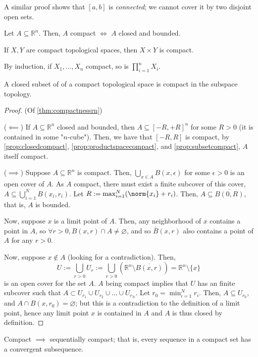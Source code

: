 \begin{remark}
    A similar proof shows that $[a, b]$ is \emph{connected}; we cannot cover it by two disjoint open sets.
\end{remark}

\begin{theorem}[On Compactness]\label{thm:compactnessrn}
    Let $A \subseteq \mathbb{R}^n$. Then, $A$ compact $\iff$ $A$ closed and bounded.
\end{theorem}

\begin{proposition}\label{prop:productspacecompact}
    If $X, Y$ are compact topological spaces, then $X \times Y$ is compact.    
\end{proposition}

\begin{remark}
    By induction, if $X_1, \dots, X_n$ compact, so is $\prod_{i=1}^{n} X_i$.
\end{remark}

\begin{proposition}\label{prop:subsetcompact}
    A closed subset of of a compact topological space is compact in the subspace topology.
\end{proposition}

\begin{proof}(Of \cref{thm:compactnessrn})

    \noindent($\impliedby$) If $A \subseteq \mathbb{R}^n$ closed and bounded, then $A \subseteq [-R, +R]^n$ for some $R > 0$ (it is contained in some "$n$-cube"). Then, we have that $[-R, R]$ is compact, by \cref{prop:closedcompact}, \cref{prop:productspacecompact}, and \cref{prop:subsetcompact}, $A$ itself compact.
    
    \noindent($\implies$) Suppose $A \subseteq \mathbb{R}^n$ is compact. Then, $\bigcup_{x \in A} B(x, \epsilon)$ for some $\epsilon > 0$ is an open cover of $A$. As $A$ compact, there must exist a finite subcover of this cover, $A \subseteq \bigcup_{i = 1}^N B(x_i, r_i)$. Let $R := \max_{i=1}^{N} (\norm{x_i} + r_i)$. Then, $A \subseteq \overline{B(0, R)}$, that is, $A$ is bounded.

    Now, suppose $x$ is a limit point of $A$. Then, any neighborhood of $x$ contains a point in $A$, so $\forall r > 0, B(x, r) \cap A \neq \varnothing$, and so $\overline{B}(x, r)$ also contains a point of $A$ for any $r > 0$. 
    
    Now, suppose $x \notin A$ (looking for a contradiction). Then, \[
    U :=\bigcup_{r > 0} U_r :=  \bigcup_{r > 0} (\mathbb{R}^n \setminus \overline{B(x, r)}) = \mathbb{R}^n \setminus \{x\}
    \]
    is an open cover for the set $A$. $A$ being compact implies that $U$ has an finite subcover such that $A \subset U_{r_1} \cup U_{r_2} \cup \dots \cup U_{r_N}$. Let $r_0 = \min_{i=1}^N r_i$. Then, $A \subseteq U_{r_0}$, and $A \cap B(x, r_0) = \varnothing$; but this is a contradiction to the definition of a limit point, hence any limit point $x$ is contained in $A$ and $A$ is thus closed by definition.
\end{proof}

\begin{proposition}
    Compact $\implies$ sequentially compact; that is, every sequence in a compact set has a convergent subsequence.
\end{proposition}